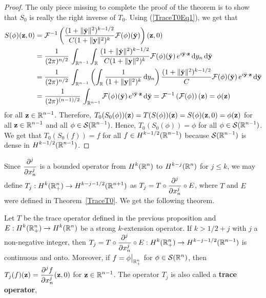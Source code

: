 \begin{proof}
The only piece missing to complete the proof of the theorem is to show
that $S_0$ is really the right inverse of $T_0$.  Using
(\ref{TraceT0Eq1}), we get that
\begin{align*}
S(\phi)(\mathbf{z},0)
&= \mathcal{F}^{-1}\left(
\frac{(1+\|\breve{\mathbf{y}}\|^2)^{k-1/2}}{C(1+ \|\mathbf{y}\|^2)^k}
\mathcal{F}(\phi)(\breve{\mathbf{y}}) \right)(\mathbf{z},0) \\
&= \frac{1}{(2\pi)^{n/2}}\,\int_{\mathbb{R}^{n-1}} \int_{\mathbb{R}} 
\frac{(1+\|\breve{\mathbf{y}}\|^2)^{k-1/2}}{C(1+ \|\mathbf{y}\|^2)^k}
\mathcal{F}(\phi)(\breve{\mathbf{y}})\, e^{i \breve{\mathbf{y}}\cdot \mathbf{z}}
\,\mathrm{d}{y_n} \,\mathrm{d}{\breve{\mathbf{y}}} \\
&= \frac{1}{(2\pi)^{n/2}}\,\int_{\mathbb{R}^{n-1}} \left(
\int_{\mathbb{R}} \frac{1}{(1+ \|\mathbf{y}\|^2)^k} \,\mathrm{d}{y_n} \right)
\frac{(1+\|\breve{\mathbf{y}}\|^2)^{k-1/2}}{C}
\mathcal{F}(\phi)(\breve{\mathbf{y}})\, e^{i \breve{\mathbf{y}}\cdot \mathbf{z}}
\,\mathrm{d}{\breve{\mathbf{y}}} \\
&= \frac{1}{(2\pi)^{(n-1)/2}}\,\int_{\mathbb{R}^{n-1}}
\mathcal{F}(\phi)(\breve{\mathbf{y}})\, e^{i \breve{\mathbf{y}}\cdot \mathbf{z}}
\,\mathrm{d}{\breve{\mathbf{y}}} = \mathcal{F}^{-1}\left(\mathcal{F}(\phi)\right)(\mathbf{z})
= \phi(\mathbf{z})  
\end{align*}
for all $\displaystyle \mathbf{z} \in \mathbb{R}^{n-1}$.  Therefore,
$T_0(S_0(\phi))(\mathbf{z}) = T(S(\phi))(\mathbf{z}) = S(\phi)(\mathbf{z},0)
= \phi(\mathbf{z})$ for all $\displaystyle \mathbf{z} \in \mathbb{R}^{n-1}$ and all
$\displaystyle \phi \in \mathcal{S}(\mathbb{R}^{n-1})$.  Hence,
$T_0(S_0(\phi)) = \phi$ for all $\displaystyle \phi \in \mathcal{S}(\mathbb{R}^{n-1})$.
We get that $T_0(S_0(f)) = f$ for all
$f \in \displaystyle H^{k-1/2}(\mathbb{R}^{n-1})$
because $\displaystyle \mathcal{S}(\mathbb{R}^{n-1})$ is dense in
$\displaystyle H^{k-1/2}(\mathbb{R}^{n-1})$.
\end{proof}

Since $\displaystyle \frac{\displaystyle \partial^{j}{}} {\displaystyle \partial x_n^{j}}$ is a bounded operator from
$\displaystyle H^k(\mathbb{R}^n)$ to $\displaystyle H^{k-j}(\mathbb{R}^n)$ for
$j\leq k$, we may define
$\displaystyle T_j : H^k(\mathbb{R}^n_+) \to H^{k-j -1/2}(\mathbb{R}^{n+1})$ 
as $\displaystyle T_j = T \circ \frac{\displaystyle \partial^{j}{}} {\displaystyle \partial x_n^{j}} \circ E$, where $T$
and $E$ were defined in Theorem~\ref{TraceT0}.  We get the following theorem.

\begin{theorem} \label{TraceTj}
Let $T$ be the trace operator defined in the previous proposition and
$\displaystyle E: H^k(\mathbb{R}^n_+) \to H^k(\mathbb{R}^n)$ be a strong
$k$-extension operator.  If $k > 1/2 +j$ with $j$ a non-negative
integer, then
$\displaystyle T_j = T \circ \frac{\displaystyle \partial^{j}{}} {\displaystyle \partial x_n^{j}} \circ E:H^k(\mathbb{R}^n_+)
\rightarrow H^{k-j-1/2}(\mathbb{R}^{n-1})$
is continuous and onto.
Moreover, if $\displaystyle f = \phi\big|_{\mathbb{R}^n_+}$ for
$\displaystyle \phi \in \mathcal{S}(\mathbb{R}^n)$, then
$\displaystyle T_j(f)(\mathbf{z}) = \frac{\displaystyle \partial^{j}{f}} {\displaystyle \partial x_n^{j}}(\mathbf{z},0)$ for
$\displaystyle \mathbf{z} \in \mathbb{R}^{n-1}$.
The operator $T_j$ is also called a
{\bfseries trace operator},
\end{theorem}

